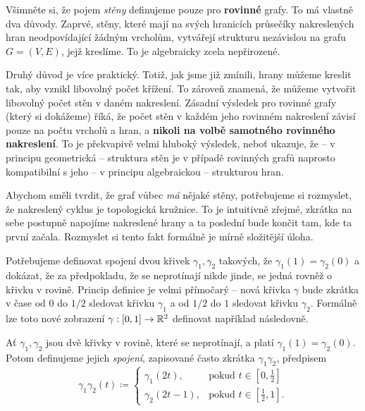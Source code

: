 \begin{remark}
 Všimněte si, že pojem \emph{stěny} definujeme pouze pro \textbf{rovinné} grafy.
 To má vlastně dva důvody. Zaprvé, stěny, které mají na svých hranicích
 průsečíky nakreslených hran neodpovídající žádným vrcholům, vytvářejí strukturu
 nezávislou na grafu $G = (V,E)$, jejž kreslíme. To je algebraicky zcela
 nepřirozené.

 Druhý důvod je více praktický. Totiž, jak jsme již zmínili, hrany můžeme
 kreslit tak, aby vznikl libovolný počet křížení. To zároveň znamená, že můžeme
 vytvořit libovolný počet stěn v daném nakreslení. Zásadní výsledek pro rovinné
 grafy (který si dokážeme) říká, že počet stěn v každém jeho rovinném nakreslení
 závisí pouze na počtu vrcholů a hran, a \textbf{nikoli na volbě samotného
 rovinného nakreslení}. To je překvapivě velmi hluboký výsledek, neboť ukazuje,
 že -- v principu geometrická -- struktura stěn je v případě rovinných grafů
 naprosto kompatibilní s jeho -- v principu algebraickou -- strukturou hran.
\end{remark}

Abychom směli tvrdit, že graf vůbec \emph{má} nějaké stěny, potřebujeme si
rozmyslet, že nakreslený cyklus je topologická kružnice. To je intuitivně
zřej\-mé, zkrátka na sebe postupně napojíme nakreslené hrany a ta poslední bude
končit tam, kde ta první začala. Rozmyslet si tento fakt formálně je mírně
složitější úloha.

Potřebujeme definovat spojení dvou křivek $\gamma_1,\gamma_2$ takových, že
$\gamma_1(1) = \gamma_2(0)$ a dokázat, že za předpokladu, že se neprotínají
nikde jinde, se jedná rovněž o křivku v rovině. Princip definice je velmi
přímočarý -- nová křivka $\gamma$ bude zkrátka v čase od $0$ do $1 / 2$ sledovat
křivku $\gamma_1$ a od $1 / 2$ do $1$ sledovat křivku $\gamma_2$. Formálně lze
toto nové zobrazení $\gamma:[0,1] \to \mathbb{R}^2$ definovat například následovně.

\begin{definition}
 \label{def:spojeni-krivek}
 Ať $\gamma_1,\gamma_2$ jsou dvě křivky v rovině, které se neprotínají, a platí
 $\gamma_1(1) = \gamma_2(0)$. Potom definujeme jejich \emph{spojení}, zapisované
 často zkrátka $\gamma_1\gamma_2$, předpisem
 \[
  \gamma_1\gamma_2(t) \coloneqq
  \begin{cases}
   \gamma_1(2t), &\text{pokud } t \in [0,\frac{1}{2}]\\
   \gamma_2(2t - 1), &\text{pokud } t \in [\frac{1}{2},1].
  \end{cases}
 \]
\end{definition}

